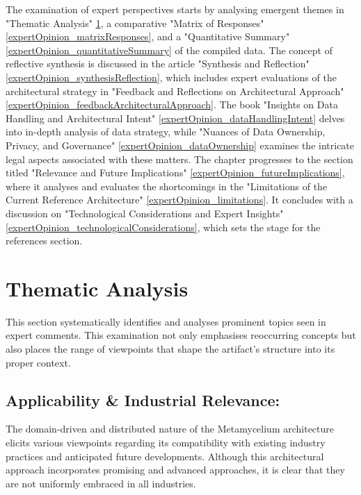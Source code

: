 \documentclass[journal]{IEEEtran}
\begin{document}
The examination of expert perspectives starts by analysing emergent themes in "Thematic Analysis" \ref{expertOpinion_thematicAnalysis}, a comparative "Matrix of Responses" \ref{expertOpinion_matrixResponses}, and a "Quantitative Summary" \ref{expertOpinion_quantitativeSummary} of the compiled data. The concept of reflective synthesis is discussed in the article "Synthesis and Reflection" \ref{expertOpinion_synthesisReflection}, which includes expert evaluations of the architectural strategy in "Feedback and Reflections on Architectural Approach" \ref{expertOpinion_feedbackArchitecturalApproach}. The book "Insights on Data Handling and Architectural Intent" \ref{expertOpinion_dataHandlingIntent} delves into in-depth analysis of data strategy, while "Nuances of Data Ownership, Privacy, and Governance" \ref{expertOpinion_dataOwnership} examines the intricate legal aspects associated with these matters. The chapter progresses to the section titled "Relevance and Future Implications" \ref{expertOpinion_futureImplications}, where it analyses and evaluates the shortcomings in the "Limitations of the Current Reference Architecture" \ref{expertOpinion_limitations}. It concludes with a discussion on "Technological Considerations and Expert Insights" \ref{expertOpinion_technologicalConsiderations}, which sets the stage for the references section.

\section{Thematic Analysis} \label{expertOpinion_thematicAnalysis}

This section systematically identifies and analyses prominent topics seen in expert comments. This examination not only emphasises reoccurring concepts but also places the range of viewpoints that shape the artifact's structure into its proper context.


\subsection{Applicability \& Industrial Relevance:}

The domain-driven and distributed nature of the Metamycelium architecture elicits various viewpoints regarding its compatibility with existing industry practices and anticipated future developments. Although this architectural approach incorporates promising and advanced approaches, it is clear that they are not uniformly embraced in all industries.
\end{document}
